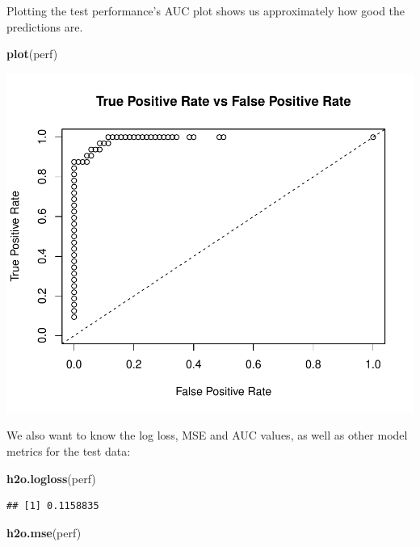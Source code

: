\documentclass[]{article}
\newenvironment{Shaded}{\begin{snugshade}}{\end{snugshade}}
\newcommand{\KeywordTok}[1]{\textcolor[rgb]{0.13,0.29,0.53}{\textbf{{#1}}}}
\newcommand{\NormalTok}[1]{{#1}}
\begin{document}
Plotting the test performance's AUC plot shows us approximately how good
the predictions are.

\begin{Shaded}
\begin{Highlighting}[]
\KeywordTok{plot}\NormalTok{(perf)}
\end{Highlighting}
\end{Shaded}

\begin{center}\includegraphics{webinar_code_files/figure-latex/auc_curve-1} \end{center}

We also want to know the log loss, MSE and AUC values, as well as other
model metrics for the test data:

\begin{Shaded}
\begin{Highlighting}[]
\KeywordTok{h2o.logloss}\NormalTok{(perf)}
\end{Highlighting}
\end{Shaded}

\begin{verbatim}
## [1] 0.1158835
\end{verbatim}

\begin{Shaded}
\begin{Highlighting}[]
\KeywordTok{h2o.mse}\NormalTok{(perf)}
\end{Highlighting}
\end{Shaded}
\end{document}
